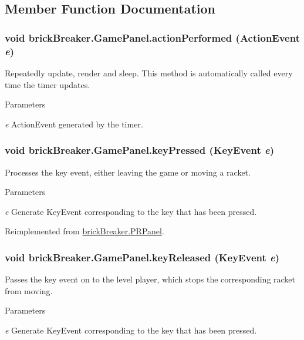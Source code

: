 \subsection{Member Function Documentation}
\hypertarget{classbrick_breaker_1_1_game_panel_a9ede756878b9f1056369baa900dcbc4f}{
\subsubsection[{actionPerformed}]{\setlength{\rightskip}{0pt plus 5cm}void brickBreaker.GamePanel.actionPerformed (ActionEvent {\em e})}}
\label{classbrick_breaker_1_1_game_panel_a9ede756878b9f1056369baa900dcbc4f}
Repeatedly update, render and sleep. This method is automatically called every time the timer updates. 
\begin{DoxyParams}{Parameters}
\item[{\em e}]ActionEvent generated by the timer. \end{DoxyParams}
\hypertarget{classbrick_breaker_1_1_game_panel_abf3d766d8fff87e69bfaf8ff59c438f3}{
\subsubsection[{keyPressed}]{\setlength{\rightskip}{0pt plus 5cm}void brickBreaker.GamePanel.keyPressed (KeyEvent {\em e})}}
\label{classbrick_breaker_1_1_game_panel_abf3d766d8fff87e69bfaf8ff59c438f3}
Processes the key event, either leaving the game or moving a racket. 
\begin{DoxyParams}{Parameters}
\item[{\em e}]Generate KeyEvent corresponding to the key that has been pressed. \end{DoxyParams}


Reimplemented from \hyperlink{classbrick_breaker_1_1_p_r_panel_af86ccc2d42dc48eb03fb6db22e593fc2}{brickBreaker.PRPanel}.

\hypertarget{classbrick_breaker_1_1_game_panel_a8c41cc926e88dc8d1a1c241e6b9ef12e}{
\subsubsection[{keyReleased}]{\setlength{\rightskip}{0pt plus 5cm}void brickBreaker.GamePanel.keyReleased (KeyEvent {\em e})}}
\label{classbrick_breaker_1_1_game_panel_a8c41cc926e88dc8d1a1c241e6b9ef12e}
Passes the key event on to the level player, which stops the corresponding racket from moving. 
\begin{DoxyParams}{Parameters}
\item[{\em e}]Generate KeyEvent corresponding to the key that has been pressed. \end{DoxyParams}


